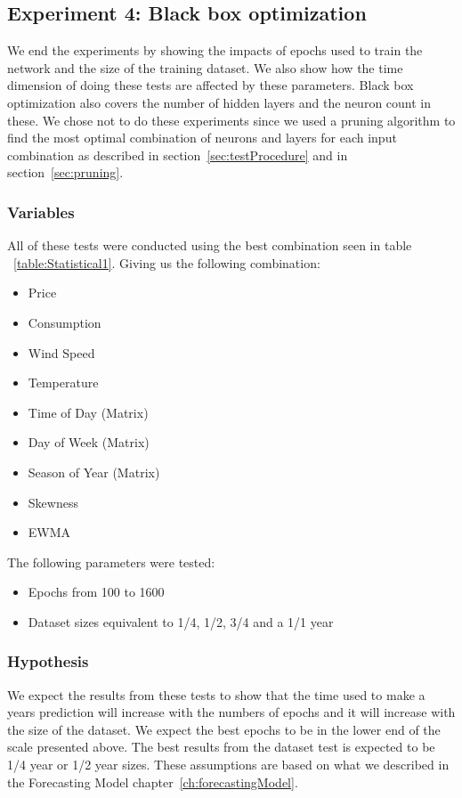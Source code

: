 \newpage
\subsection{Experiment 4: Black box optimization}
We end the experiments by showing the impacts of epochs used to train the network and the size of the training dataset. We also show how the time dimension of doing these tests are affected by these parameters. Black box optimization also covers the number of hidden layers and the neuron count in these. We chose not to do these experiments since we used a pruning algorithm to find the most optimal combination of neurons and layers for each input combination as described in section~\ref{sec:testProcedure} and in section~\ref{sec:pruning}.

\subsubsection{Variables}
All of these tests were conducted using the best combination seen in table ~\ref{table:Statistical1}. Giving us the following combination:
\begin{itemize}
	\item Price
	\item Consumption
	\item Wind Speed
	\item Temperature
	\item Time of Day (Matrix)
	\item Day of Week (Matrix)
	\item Season of Year (Matrix)
	\item Skewness
	\item EWMA
\end{itemize}

The following parameters were tested:

\begin{itemize}
	\item Epochs from 100 to 1600
	\item Dataset sizes equivalent to 1/4, 1/2, 3/4 and a 1/1 year
\end{itemize}

\subsubsection{Hypothesis}
We expect the results from these tests to show that the time used to make a years prediction will increase with the numbers of epochs and it will increase with the size of the dataset. We expect the best epochs to be in the lower end of the scale presented above. The best results from the dataset test is expected to be 1/4 year or 1/2 year sizes. These assumptions are based on what we described in the Forecasting Model chapter~\ref{ch:forecastingModel}.

